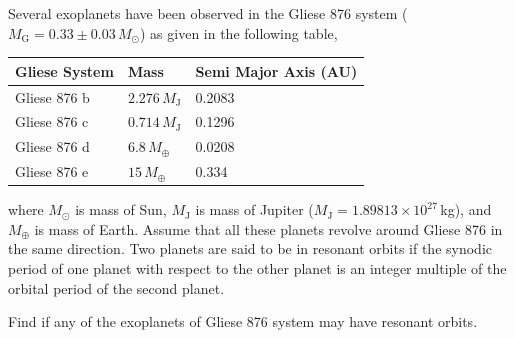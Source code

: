 Several exoplanets have been observed in the Gliese 876 system
($M_{\mathrm{G}} = 0.33 \pm 0.03\,M_\odot$) as given in the following table,

\begin{center}
\begin{tabular}{|l|l|l|}
\hline
\textbf{Gliese System} & \textbf{Mass} & \textbf{Semi Major Axis (AU)} \\
\hline
Gliese 876 b & $2.276\,M_{\mathrm{J}}$ & 0.2083 \\
\hline
Gliese 876 c & $0.714\,M_{\mathrm{J}}$ & 0.1296 \\
\hline
Gliese 876 d & $6.8\,M_\oplus$ & 0.0208 \\
\hline
Gliese 876 e & $15\,M_\oplus$ & 0.334 \\
\hline
\end{tabular}
\end{center}

where $M_\odot$ is mass of Sun, $M_{\mathrm{J}}$ is mass of Jupiter
($M_{\mathrm{J}} = 1.89813 \times 10^{27}$\,kg), and $M_\oplus$ is mass of
Earth. Assume that all these planets revolve around Gliese 876 in the same
direction. Two planets are said to be in resonant orbits if the synodic period
of one planet with respect to the other planet is an integer multiple of the
orbital period of the second planet.

Find if any of the exoplanets of Gliese 876 system may have resonant orbits.
